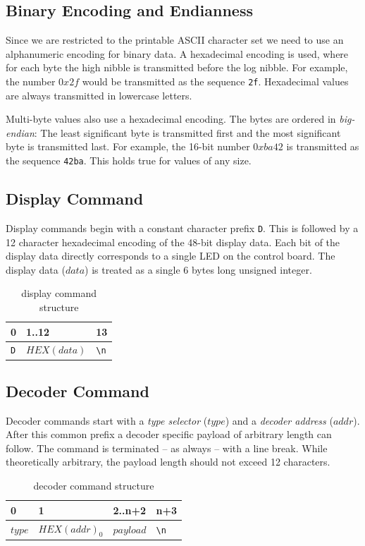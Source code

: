\documentclass{scrreprt}
\begin{document}
\subsection{Binary Encoding and Endianness}
Since we are restricted to the printable ASCII character set we need to use an alphanumeric encoding for binary data.
A hexadecimal encoding is used, where for each byte the high nibble is transmitted before the log nibble.
For example, the number $0x2f$ would be transmitted as the sequence \texttt{2f}.
Hexadecimal values are always transmitted in lowercase letters.

Multi-byte values also use a hexadecimal encoding.
The bytes are ordered in \emph{big-endian}:
The least significant byte is transmitted first and the most significant byte is transmitted last.
For example, the 16-bit number $0xba42$ is transmitted as the sequence \texttt{42ba}.
This holds true for values of any size.

\subsection{Display Command}
Display commands begin with a constant character prefix \texttt{D}.
This is followed by a 12 character hexadecimal encoding of the 48-bit display data.
Each bit of the display data directly corresponds to a single LED on the control board.
The display data ($data$) is treated as a single 6 bytes long unsigned integer.

\begin{table}[h!]
\centering
\begin{tabular}{ |l|l|l| } 
\multicolumn{1}{l}{0} & \multicolumn{1}{l}{1..12} & \multicolumn{1}{l}{13} \\ \hline
\texttt{D} & $HEX(data)$ & \texttt{\textbackslash{}n} \\\hline
\end{tabular}
\caption{display command structure}
\end{table}

\subsection{Decoder Command}
Decoder commands start with a \emph{type selector} ($type$) and a \emph{decoder address} ($addr$).
After this common prefix a decoder specific payload of arbitrary length can follow.
The command is terminated -- as always -- with a line break.
While theoretically arbitrary, the payload length should not exceed 12 characters.
\begin{table}[h!]
\centering
\begin{tabular}{ |l|l|l|l| } 
\multicolumn{1}{l}{0} & \multicolumn{1}{l}{1} & \multicolumn{1}{l}{2..n+2} & \multicolumn{1}{l}{n+3} \\ \hline
$type$ & $HEX(addr)_0$ & $payload$ & \texttt{\textbackslash{}n} \\\hline
\end{tabular}
\caption{decoder command structure}
\end{table}
\end{document}
